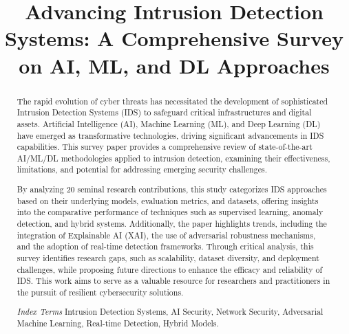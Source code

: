 \documentclass[conference]{IEEEtran}
\begin{document}
\title{Advancing Intrusion Detection Systems: A Comprehensive Survey on AI, ML, and DL Approaches}

\author{
}


\maketitle
\begin{abstract}

The rapid evolution of cyber threats has necessitated the development of sophisticated Intrusion Detection Systems (IDS) to safeguard critical infrastructures and digital assets. Artificial Intelligence (AI), Machine Learning (ML), and Deep Learning (DL) have emerged as transformative technologies, driving significant advancements in IDS capabilities. This survey paper provides a comprehensive review of state-of-the-art AI/ML/DL methodologies applied to intrusion detection, examining their effectiveness, limitations, and potential for addressing emerging security challenges. 

By analyzing 20 seminal research contributions, this study categorizes IDS approaches based on their underlying models, evaluation metrics, and datasets, offering insights into the comparative performance of techniques such as supervised learning, anomaly detection, and hybrid systems. Additionally, the paper highlights trends, including the integration of Explainable AI (XAI), the use of adversarial robustness mechanisms, and the adoption of real-time detection frameworks. Through critical analysis, this survey identifies research gaps, such as scalability, dataset diversity, and deployment challenges, while proposing future directions to enhance the efficacy and reliability of IDS. This work aims to serve as a valuable resource for researchers and practitioners in the pursuit of resilient cybersecurity solutions.

\textit{Index Terms} Intrusion Detection Systems, AI Security, Network Security, Adversarial Machine Learning, Real-time Detection, Hybrid Models.

\end{abstract}


\IEEEpeerreviewmaketitle










\balance

%
\end{document}
